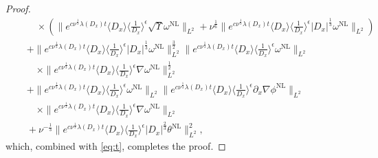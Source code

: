 \documentclass[reqno, 12pt]{amsart} %
\theoremstyle{plain} %
\theoremstyle{definition}
\theoremstyle{remark}
\numberwithin{equation}{section} %
\newcommand{\px}{\partial_x}
\begin{document}
\begin{proof}
{\begin{align*}
				&\qquad  \times\left(\|e^{c \nu^{\frac{1}{3}} \lambda\left(D_x\right) t}\langle D_x\rangle\langle\frac{1}{D_x}\rangle^\epsilon \sqrt{\Upsilon} \omega^{\mathrm{NL}}\|_{L^2}+\nu^{\frac{1}{6}}\|e^{c \nu^{\frac{1}{3}} \lambda\left(D_x\right) t}\langle D_x\rangle\langle\frac{1}{D_x}\rangle^\epsilon |D_x|^\frac13 \omega^{\mathrm{NL}}\|_{L^2}\right) \\
				&\quad + \|e^{c \nu^{\frac{1}{3}} \lambda\left(D_x\right) t}\langle D_x\rangle    \langle \frac{1}{D_x}\rangle^\epsilon  \left|D_x\right|^{\frac{1}{3}}\omega^{\mathrm{NL}}\|_{L^2}^\frac32 \|e^{c \nu^{\frac{1}{3}} \lambda\left(D_x\right) t}\langle D_x\rangle\langle\frac{1}{D_x}\rangle^\epsilon \omega^{\mathrm{NL}}\|_{L^2} \\
				& \qquad \times\|e^{c \nu^{\frac{1}{3}} \lambda\left(D_x\right) t}\langle D_x\rangle\langle\frac{1}{D_x}\rangle^\epsilon \nabla  \omega^{\mathrm{NL}}\|_{L^2}^\frac12 \\
				& \quad + \|e^{c \nu^{\frac{1}{3}} \lambda\left(D_x\right) t}\langle D_x\rangle    \langle \frac{1}{D_x}\rangle^\epsilon  \omega^{\mathrm{NL}}\|_{L^2} \|e^{c \nu^{\frac{1}{3}} \lambda\left(D_x\right) t}\langle D_x\rangle\langle\frac{1}{D_x}\rangle^\epsilon \px \nabla \phi^{\mathrm{NL}}\|_{L^2} \\
				& \qquad \times\|e^{c \nu^{\frac{1}{3}} \lambda\left(D_x\right) t}\langle D_x\rangle\langle\frac{1}{D_x}\rangle^\epsilon \nabla \omega^{\mathrm{NL}}\|_{L^2} \\
				&\quad + \nu^{-\frac13 }\| e^{c \nu^{\frac{1}{3}} \lambda\left(D_x\right) t}\langle D_x\rangle\langle\frac{1}{D_x}\rangle^\epsilon |D_x|^\frac23 \theta^{\mathrm{NL}}  \|_{L^2}^2,
		\end{align*} }
		which, combined with \eqref{eq:t}, completes the proof.
	\end{proof}
	
\end{document}
